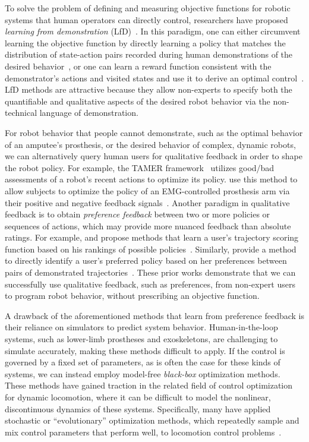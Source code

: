 To solve the problem of defining and measuring objective functions for robotic
systems that human operators can directly control, researchers have proposed
\emph{learning from demonstration} (LfD)~\citep{argall2009survey}. In this
paradigm, one can either circumvent learning the objective function by directly
learning a policy that matches the distribution of state-action pairs recorded
during human demonstrations of the desired
behavior~\citep{pomerleau1991efficient, schaal1999imitation}, or one can learn a
reward function consistent with the demonstrator's actions and visited states
and use it to derive an optimal control~\citep{ng2000algorithms,
ratliff2006maximum, ziebart2009human}. LfD methods are attractive because they
allow non-experts to specify both the quantifiable and qualitative aspects of
the desired robot behavior via the non-technical language of demonstration.

For robot behavior that people cannot demonstrate, such as the optimal behavior
of an amputee's prosthesis, or the desired behavior of complex, dynamic robots,
we can alternatively query human users for qualitative feedback in order to
shape the robot policy. For example, the TAMER
framework~\citep{knox2009interactively, knox2013training} utilizes good/bad
assessments of a robot's recent actions to optimize its policy.
\citeauthor{pilarski2011online} use this method to allow subjects to optimize
the policy of an EMG-controlled prosthesis arm via their positive and negative
feedback signals~\citep{pilarski2011online}.  Another paradigm in qualitative
feedback is to obtain \emph{preference feedback} between two or more policies or
sequences of actions, which may provide more nuanced feedback than absolute
ratings. For example, \citeauthor{jain2013learning} and
\citeauthor{akrour2014programming} propose methods that learn a user's
trajectory scoring function based on his rankings of possible
policies~\citep{jain2013learning, akrour2014programming}. Similarly,
\citeauthor{wilson2012bayesian} provide a method to directly identify a user's
preferred policy based on her preferences between pairs of demonstrated
trajectories~\citep{wilson2012bayesian}. These prior works demonstrate that we
can successfully use qualitative feedback, such as preferences, from non-expert
users to program robot behavior, without prescribing an objective function.

A drawback of the aforementioned methods that learn from preference feedback is
their reliance on simulators to predict system behavior. Human-in-the-loop
systems, such as lower-limb prostheses and exoskeletons, are challenging to
simulate accurately, making these methods difficult to apply. If the control is
governed by a fixed set of parameters, as is often the case for these kinds of
systems, we can instead employ model-free \emph{black-box} optimization methods.
These methods have gained traction in the related field of control optimization
for dynamic locomotion, where it can be difficult to model the nonlinear,
discontinuous dynamics of these systems.  Specifically, many have applied
stochastic or ``evolutionary'' optimization methods, which repeatedly sample and
mix control parameters that perform well, to locomotion control
problems~\citep{gong2010review}. 

